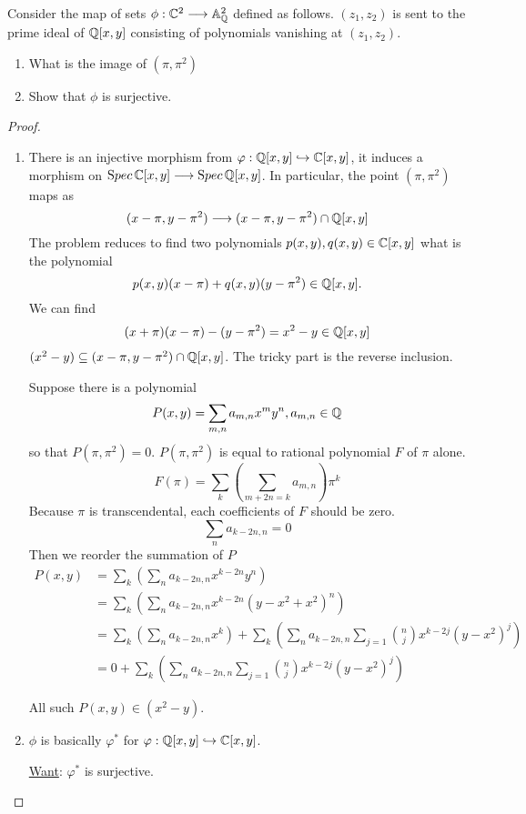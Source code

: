 \documentclass[11pt,fleqn]{book}
\begin{document}
\begin{exr}
Consider the map of sets $\phi: \mathbb C^2\longrightarrow \mathbb{A}_\mathbb Q^{2}$ defined as follows. $(z_1,z_2)$ is sent to the prime ideal of $\mathbb Q[x,y]$ consisting of polynomials vanishing at $(z_1,z_2)$.
\begin{enumerate}[label=(\alph*)]
\item What is the image of $(\pi,\pi^2)$
\item Show that $\phi$ is surjective.
\end{enumerate}
\end{exr}
\begin{proof}
\begin{enumerate}[label=(\alph*)]
\item 
There is an injective morphism from $\varphi:\mathbb Q[x,y]\hookrightarrow \mathbb C[x,y]$, it induces a morphism on ${\text Spec\,} \mathbb C[x,y]\longrightarrow {\text Spec\,} \mathbb Q[x,y]$. In particular, the point $(\pi,\pi^2)$ maps as 
$$
(x-\pi,y-\pi^2)\longrightarrow (x-\pi,y-\pi^2)\cap \mathbb Q[x,y]
$$
The problem reduces to find two polynomials $p(x,y),q(x,y)\in\mathbb C[x,y]$ what is the polynomial
$$
p(x,y)(x-\pi)+q(x,y)(y-\pi^2)\in \mathbb Q[x,y].
$$
We can find 
$$
(x+\pi)(x-\pi)-(y-\pi^2)=x^2-y\in \mathbb Q[x,y]
$$
$(x^2-y)\subseteq (x-\pi,y-\pi^2)\cap\mathbb Q[x,y]$. The tricky part is the reverse inclusion. 

Suppose there is a polynomial 
$$
P(x,y)=\sum_{m,n}a_{m,n}x^{m}y^{n}, a_{m,n}\in \mathbb Q
$$
so that $P(\pi,\pi^2)=0$. $P(\pi,\pi^2)$ is equal to rational polynomial $F$ of $\pi$ alone. 
$$
F(\pi)=\sum_k(\sum_{m+2n=k} a_{m,n})\pi^{k} 
$$
Because $\pi$ is transcendental, each coefficients of $F$ should be zero.
$$
\sum_n a_{k-2n,n}=0
$$
 Then we reorder the summation of $P$
$$
\begin{aligned}
P(x,y)&=\sum_{k}\left(\sum_{n}a_{k-2n,n}x^{k-2n}y^{n}\right)\\
&=\sum_{k}\left(\sum_{n}a_{k-2n,n}x^{k-2n}(y-x^2+x^2)^{n}\right)\\
&=\sum_{k}\left(\sum_{n}a_{k-2n,n}x^{k}\right)+\sum_{k}\left(\sum_{n}a_{k-2n,n}\sum_{j=1}\binom{n}{j} x^{k-2j}(y-x^2)^{j}\right)\\
&=0+\sum_{k}\left(\sum_{n}a_{k-2n,n}\sum_{j=1}\binom{n}{j} x^{k-2j}(y-x^2)^{j}\right)
\end{aligned}
$$

All such $P(x,y)\in (x^2-y)$.

\item $\phi$ is basically $\varphi^*$ for $\varphi:\mathbb Q[x,y]\hookrightarrow \mathbb C[x,y]$. 

\underline{Want}: $\varphi^*$ is surjective.


\end{enumerate}
\end{proof}
\end{document}
